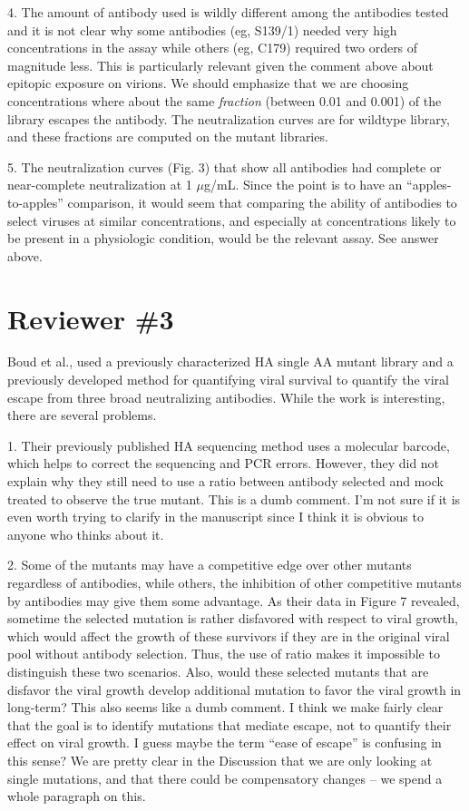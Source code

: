 \documentclass[11pt, oneside]{article}   	%
\begin{document}
4. The amount of antibody used is wildly different among the antibodies tested and it is not clear why some antibodies (eg, S139/1) needed very high concentrations in the assay while others (eg, C179) required two orders of magnitude less. This is particularly relevant given the comment above about epitopic exposure on virions.
{\color{red}
We should emphasize that we are choosing concentrations where about the same \emph{fraction} (between 0.01 and 0.001) of the library escapes the antibody.
The neutralization curves are for wildtype library, and these fractions are computed on the mutant libraries.
}

5. The neutralization curves (Fig. 3) that show all antibodies had complete or near-complete neutralization at 1 $\mu$g/mL. Since the point is to have an ``apples-to-apples'' comparison, it would seem that comparing the ability of antibodies to select viruses at similar concentrations, and especially at concentrations likely to be present in a physiologic condition, would be the relevant assay.
{\color{red}
See answer above.
}


\section*{Reviewer \#3} 
Boud et al., used a previously characterized HA single AA mutant library and a previously developed method for quantifying viral survival to quantify the viral escape from three broad neutralizing antibodies. While the work is interesting, there are several problems.

1. Their previously published HA sequencing method uses a molecular barcode, which helps to correct the sequencing and PCR errors. However, they did not explain why they still need to use a ratio between antibody selected and mock treated to observe the true mutant.
{\color{red} 
This is a dumb comment. 
I'm not sure if it is even worth trying to clarify in the manuscript since I think it is obvious to anyone who thinks about it.
}

2. Some of the mutants may have a competitive edge over other mutants regardless of antibodies, while others, the inhibition of other competitive mutants by antibodies may give them some advantage. As their data in Figure 7 revealed, sometime the selected mutation is rather disfavored with respect to viral growth, which would affect the growth of these survivors if they are in the original viral pool without antibody selection. Thus, the use of ratio makes it impossible to distinguish these two scenarios. Also, would these selected mutants that are disfavor the viral growth develop additional mutation to favor the viral growth in long-term?
{\color{red}
This also seems like a dumb comment.
I think we make fairly clear that the goal is to identify mutations that mediate escape, not to quantify their effect on viral growth.
I guess maybe the term ``ease of escape'' is confusing in this sense?
We are pretty clear in the Discussion that we are only looking at single mutations, and that there could be compensatory changes -- we spend a whole paragraph on this.
}
\end{document}
